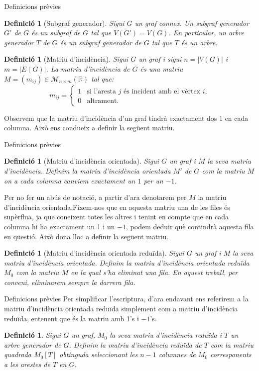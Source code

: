 \documentclass{beamer}
\newtheorem{defin}[theorem]{Definició}
\begin{document}
\begin{frame}{Definicions prèvies}
    \begin{defin}[Subgraf generador]
        \normalfont Sigui $G$ un graf connex. Un subgraf generador $G'$ de $G$ és un subgraf de $G$ tal que $V(G')=V(G)$. En particular, un arbre generador $T$ de $G$ és un subgraf generador de $G$ tal que $T$ és un arbre.
    \end{defin}\pause
    \begin{defin}[Matriu d'incidència]
        \normalfont Sigui $G$ un graf i sigui $n=|V(G)|$ i $m=|E(G)|$. La matriu d'incidència de $G$ és una matriu $M=(m_{ij})\in\mathcal{M}_{n\times m}(\mathbb{R})$ tal que:
        $$m_{ij}=\left\{\begin{array}{ll}
                1 & \text{si l'aresta $j$ és incident amb el vèrtex $i$,} \\
                0 & \text{altrament.}
            \end{array}\right.$$
    \end{defin}\pause
    Observem que la matriu d'incidència d'un graf tindrà exactament dos 1 en cada columna. Això ens condueix a definir la següent matriu.
\end{frame}
\begin{frame}{Definicions prèvies}
    \begin{defin}[Matriu d'incidència orientada]
        \normalfont Sigui $G$ un graf i $M$ la seva matriu d'incidència. Definim la matriu d'incidència orientada $M'$ de $G$ com la matriu $M$ on a cada columna canviem exactament un $1$ per un $-1$.
    \end{defin}\pause
    Per no fer un abús de notació, a partir d'ara denotarem per $M$ la matriu d'incidència orientada.\pause\space Fixem-nos que en aquesta matriu una de les files és supèrflua, ja que coneixent totes les altres i tenint en compte que en cada columna hi ha exactament un 1 i un $-1$, podem deduir què contindrà aquesta fila en qüestió. Això dona lloc a definir la següent matriu.\pause
    \begin{defin}[Matriu d'incidència orientada reduïda]
        \normalfont Sigui $G$ un graf i $M$ la seva matriu d'incidència orientada. Definim la matriu d'incidència orientada reduïda $M_0$ com la matriu $M$ en la qual s'ha eliminat una fila.  En aquest treball, per conveni, eliminarem sempre la darrera fila.
    \end{defin}
\end{frame}
\begin{frame}{Definicions prèvies}
    Per simplificar l'escriptura, d'ara endavant ens referirem a la matriu d'incidència orientada reduïda simplement com a matriu d'incidència reduïda, entenent que és la matriu amb 1's i $-1$'s.\pause
    \begin{defin}
        \normalfont Sigui $G$ un graf, $M_0$ la seva matriu d'incidència reduïda i $T$ un arbre generador de $G$. Definim la matriu d'incidència reduïda de $T$ com la matriu quadrada $M_0[T]$ obtinguda seleccionant les $n-1$ columnes de $M_0$ corresponents a les arestes de $T$ en $G$.
    \end{defin}
\end{frame}
\end{document}
